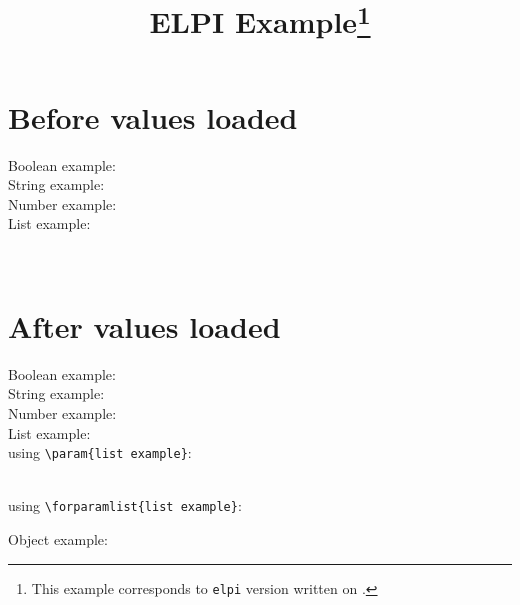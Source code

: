 \documentclass{article}
\begin{document}
    \title{ELPI Example\thanks{This example corresponds to \texttt{elpi} version \gitversion{} written on \gitdate.}}
    \author{\dogitauthors[\\]}
    \maketitle

    \begin{minipage}[t]{.5\linewidth}
        \section*{Before values loaded}

        Boolean example:
        \\

        String example:
        \\

        Number example:
        \\

        List example:\\
        \parbox{.7 \linewidth}{}\\
        \begin{enumerate}
            \newcommand\formatitem[1]{\item #1}
        \end{enumerate}
    \end{minipage}%
    \begin{minipage}[t]{.5\linewidth}
        \section*{After values loaded}

        Boolean example:
        \\

        String example:
        \\

        Number example:
        \\

        List example:\\
        using \verb|\param{list example}|:\\
        \parbox{.7 \linewidth}{}\\

        using \verb|\forparamlist{list example}|:\\[-1em]
        \begin{enumerate}
            \newcommand\formatitem[1]{\item #1}
        \end{enumerate}

        Object example:\\

    \end{minipage}
\end{document}
